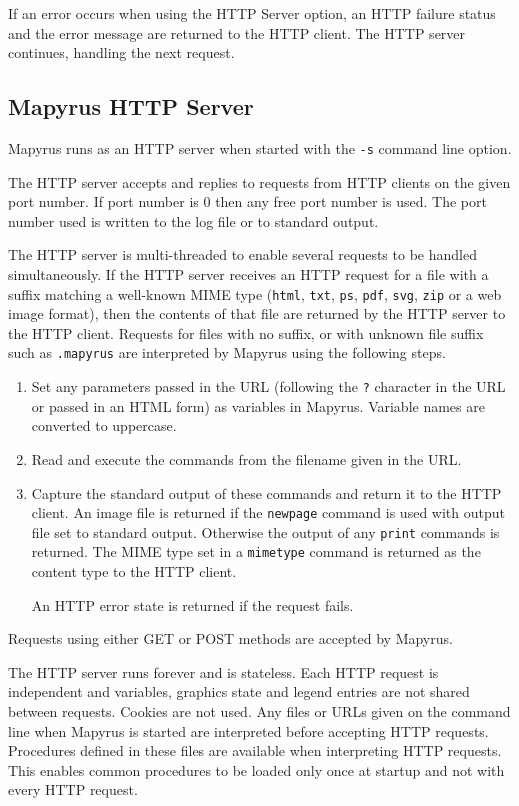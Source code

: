If an error occurs when using the HTTP Server
option, an HTTP failure status and the error message
are returned to the HTTP client.  The HTTP server continues,
handling the next request.

\subsection{Mapyrus HTTP Server}

Mapyrus runs as an HTTP server when started with the \texttt{-s} command line
option.

The HTTP server accepts and replies to requests from HTTP clients on the given
port number.  If port number is 0 then any free port number is used.  The port
number used is written to the log file or to standard output.

The HTTP server is multi-threaded to enable several requests to be handled
simultaneously.  If the HTTP server receives an HTTP request for a file with a
suffix matching a well-known MIME type (\texttt{html}, \texttt{txt},
\texttt{ps}, \texttt{pdf}, \texttt{svg}, \texttt{zip}
or a web image format), then the
contents of that file are returned by the HTTP server to the HTTP client.
Requests for files with no suffix, or with unknown file suffix
such as \texttt{.mapyrus} are interpreted
by Mapyrus using the following steps.

\begin{enumerate}
\item
Set any parameters passed in the URL (following the \texttt{?} character in
the URL or passed in an HTML form) as variables in Mapyrus.
Variable names are converted to uppercase.
\item
Read and execute the commands from the filename given in the URL.
\item
Capture the standard output of these commands and return it to the
HTTP client.
An image file is returned if the
\texttt{newpage} command is used with output file set
to standard output.
Otherwise the output of any \texttt{print} commands is returned.
The MIME type set in a \texttt{mimetype} command is returned as
the content type to the HTTP client.

An HTTP error state is returned if the request fails.
\end{enumerate}

Requests using either GET or POST methods are accepted by Mapyrus.

The HTTP server runs forever and
is stateless.  Each HTTP request is independent and
variables, graphics state and legend entries are not shared between
requests.  Cookies are not used.
Any files or URLs given on the command line when Mapyrus is started
are interpreted before accepting HTTP requests.
Procedures defined in these files
are available when interpreting HTTP requests.  This enables
common procedures to be loaded only once at startup and not with every
HTTP request.

